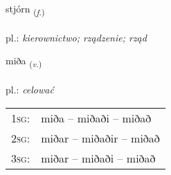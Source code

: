 \documentclass[frontgrid, backgrid]{flacards}\usepackage[]{graphicx}\usepackage[]{xcolor}
\begin{document}
\renewcommand{\flhead}{\vskip5pt \fboxsep=0pt {\small\bfseries\footnotesize Nafnorð | Noun}}
\renewcommand{\fcfoot}{\vskip5pt \fboxsep=0pt \hspace{2pt}{\small\bfseries\footnotesize 1K}}

\renewcommand{\blhead}{\vskip5pt {\small\bfseries\footnotesize Nafnorð | Noun }}
\renewcommand{\bcfoot}{\vskip5pt \hspace{2pt}{\small\bfseries\footnotesize 1K}}


{stjórn \small{\textsubscript{(\textit{f.})}} \\[1ex] %
\textphonetic{[stjourtn̥]} \\
pl.: \emph{kierownictwo; rządzenie; rząd} \\  [2ex]
\renewcommand*{\arraystretch}{0.8}
}

\renewcommand{\flhead}{\vskip5pt \fboxsep=0pt {\small\bfseries\footnotesize Sagnorð | Verb}}
\renewcommand{\fcfoot}{\vskip5pt \fboxsep=0pt \hspace{2pt}{\small\bfseries\footnotesize 1K}}

\renewcommand{\blhead}{\vskip5pt {\small\bfseries\footnotesize Sagnorð | Verb }}
\renewcommand{\bcfoot}{\vskip5pt \hspace{2pt}{\small\bfseries\footnotesize 1K}}


{miða \small{\textsubscript{(\textit{v.})}} \\[1ex] %
\textphonetic{[mɪːða]} \\
pl.: \emph{celować} \\  [2ex]
\renewcommand*{\arraystretch}{0.8}
\begin{tabular}{p{1cm}l}
\textsc{1sg}: & miða -- miðaði -- miðað \\ 
\textsc{2sg}: & miðar -- miðaðir -- miðað \\ 
\textsc{3sg}: & miðar -- miðaði -- miðað \\ 
\end{tabular}
}
\end{document}

